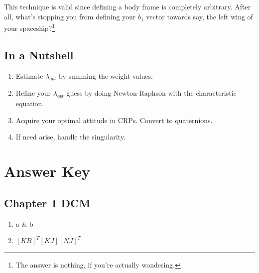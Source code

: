 \documentclass[a4paper,14pt]{extreport}
\begin{document}
This technique is valid since defining a body frame is completely arbitrary. After all, what's stopping you from defining your $b_1$ vector towards say, the left wing of your spaceship?\footnote{The answer is nothing, if you're actually wondering.}
\section{In a Nutshell}
\begin{enumerate}
\item{Estimate \(\lambda_{opt}\) by summing the weight values.}
\item{Refine your \(\lambda_{opt}\) guess by doing Newton-Raphson with the characteristic equation.}
\item{Acquire your optimal attitude in CRPs. Convert to quaternions.}
\item{If need arise, handle the singularity.} 
\end{enumerate}
\chapter{Answer Key}
\section{Chapter 1 DCM}
\begin{enumerate}
\item{a \& b}
\item{$[KB]^T[KJ][NJ]^T$}


\end{enumerate}
\end{document}
